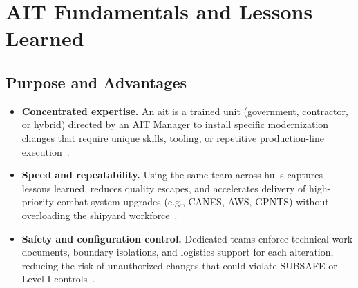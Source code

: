 \documentclass[../main.tex]{subfiles}
\begin{document}
\section{AIT Fundamentals and Lessons Learned}
\minibib

\subsection{Purpose and Advantages}
\begin{itemize}
\item \textbf{Concentrated expertise.} An \ac{ait} is a trained unit (government, contractor, or hybrid) directed by an AIT Manager to install specific modernization changes that require unique skills, tooling, or repetitive production-line execution~\autocite{TS9090-310,edo-4-1-4-ait-fundamentals-2025}.
\item \textbf{Speed and repeatability.} Using the same team across hulls captures lessons learned, reduces quality escapes, and accelerates delivery of high-priority combat system upgrades (e.g., CANES, AWS, GPNTS) without overloading the shipyard workforce~\autocite{SL720-AA-MAN-030}.
\item \textbf{Safety and configuration control.} Dedicated teams enforce technical work documents, boundary isolations, and logistics support for each alteration, reducing the risk of unauthorized changes that could violate SUBSAFE or Level I controls~\autocite{TS9090-310}.
\end{itemize}
\end{document}
